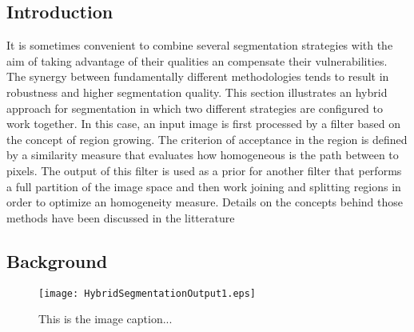 %
%
% 
%
%
%

\subsection{Introduction}
\label{sec:HybridSegmentationIntroduction}


It is sometimes convenient to combine several segmentation strategies with the
aim of taking advantage of their qualities an compensate their vulnerabilities.
The synergy between fundamentally different methodologies tends to result in
robustness and higher segmentation quality.  This section illustrates an hybrid
approach for segmentation in which two different strategies are configured to
work together. In this case, an input image is first processed by a filter
based on the concept of region growing. The criterion of acceptance in the
region is defined by a similarity measure that evaluates how homogeneous is the
path between to pixels. The output of this filter is used as a prior for
another filter that performs a full partition of the image space and then work
joining and splitting regions in order to optimize an homogeneity measure.
Details on the concepts behind those methods have been discussed in the
litterature
\cite{Angelini2002,Udupa2002,Jin2002,Imielinska2001,Imielinska2000a,Imielinska2000b}



\subsection{Background}
\label{sec:HybridSegmentationBackground}


%
%
%

\begin{figure}
\center
\texttt{[image: HybridSegmentationOutput1.eps]}
\caption{This is the image caption...}
\label{fig:HybridSegmentationImage1}
\end{figure}


